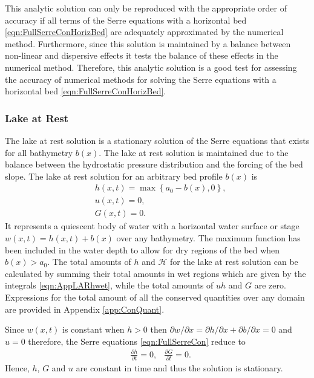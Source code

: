 This analytic solution can only be reproduced with the appropriate order of accuracy if all terms of the Serre equations with a horizontal bed \eqref{eqn:FullSerreConHorizBed} are adequately approximated by the numerical method. Furthermore, since this solution is maintained by a balance between non-linear and dispersive effects it tests the balance of these effects in the numerical method. Therefore, this analytic solution is a good test for assessing the accuracy of numerical methods for solving the Serre equations with a horizontal bed \eqref{eqn:FullSerreConHorizBed}.

\subsubsection{Lake at Rest}
The lake at rest solution is a stationary solution of the Serre equations that exists for all bathymetry $b(x)$. The lake at rest solution is maintained due to the balance between the hydrostatic pressure distribution and the forcing of the bed slope. The lake at rest solution for an arbitrary bed profile $b(x)$ is
\begin{subequations}
	\begin{align}
	&h(x,t) = \max\left\lbrace a_0 - b(x), 0 \right\rbrace, \\
	&u(x,t) = 0 , \\
	&G(x,t) = 0 .
	\end{align}
	\label{eqn:LARdefhub}
\end{subequations}
It represents a quiescent body of water with a horizontal water surface or stage $w(x,t) = h(x,t) + b(x)$ over any bathymetry. The maximum function has been included in the water depth to allow for dry regions of the bed when $b(x) > a_0$. The total amounts of $h$ and $\mathcal{H}$ for the lake at rest solution can be calculated by summing their total amounts in wet regions which are given by the integrals \eqref{eqn:AppLARhwet}, while the total amounts of $uh$ and $G$ are zero. Expressions for the total amount of all the conserved quantities over any domain are provided in Appendix \ref{app:ConQuant}. 

Since $w(x,t)$ is constant when $h> 0$ then $\partial w / \partial x = \partial h / \partial x + \partial b / \partial x = 0 $ and $u=0$ therefore, the Serre equations \eqref{eqn:FullSerreCon} reduce to
\begin{align*}
& \frac{\partial h}{\partial t}  = 0,  &\frac{\partial G}{\partial t}  = 0.
\end{align*}
Hence, $h$, $G$ and $u$ are constant in time and thus the solution is stationary.

